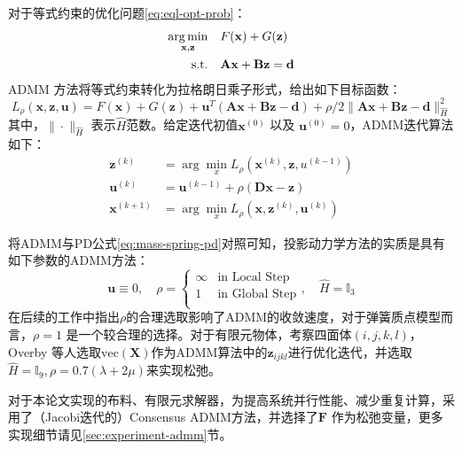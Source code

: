 对于等式约束的优化问题\ref{eq:eql-opt-prob}：
\begin{equation}\label{eq:eql-opt-prob}
\begin{aligned}
  \mathop{\arg\min}\limits_{\mathbf x,\mathbf z}&\quad F(\mathbf x)+G(\mathbf z)\\
  \mathrm{s.t.}&\quad \mathbf A\mathbf x +\mathbf B\mathbf z = \mathbf d
\end{aligned}  
\end{equation}
ADMM 方法将等式约束转化为拉格朗日乘子形式，给出如下目标函数：
\begin{equation}
  L_{\rho}(\mathbf x,\mathbf z,\mathbf u)= F(\mathbf x)+G(\mathbf z)+\mathbf u^{T}(\mathbf A\mathbf x+\mathbf B\mathbf z-\mathbf d)+\rho/2 \|\mathbf A\mathbf x+\mathbf B\mathbf z-\mathbf d\|_{\hat H}^{2}
\end{equation}
其中，$\| \cdot \|_{\hat H}$ 表示$\hat H$范数。给定迭代初值$\mathbf x^{(0)}$ 以及 $\mathbf u^{(0)} = 0$，ADMM迭代算法如下：
\begin{equation}\label{eq:admm-algorithm}
  \begin{aligned}
    \mathbf z^{(k)} &= \arg\min_{x} L_{\rho}(\mathbf x^{(k)},\mathbf  z, u^{(k-1)})\\
    \mathbf u^{(k)} &= \mathbf u^{(k-1)} + \rho(\mathbf{Dx}-\mathbf{z})\\
    \mathbf x^{(k+1)} &= \arg\min_{x} L_{\rho}(\mathbf x, \mathbf z^{(k)}, \mathbf u^{(k)})
  \end{aligned}
\end{equation}

将ADMM与PD公式\ref{eq:mass-spring-pd}对照可知，投影动力学方法的实质是具有如下参数的ADMM方法：
\begin{equation}
  \mathbf u \equiv 0,\quad \rho = \begin{cases}
    \infty & \text{in Local Step}\\
    1 & \text{in Global Step}\\
  \end{cases}, \quad\hat H = \mathbb I_3
\end{equation}
在后续的工作中指出$\rho$的合理选取影响了ADMM的收敛速度，对于弹簧质点模型而言，$\rho = 1$ 是一个较合理的选择。对于有限元物体，考察四面体$(i,j,k,l)$，Overby 等人选取$\mathrm{vec}(\mathbf X)$作为ADMM算法中的$\mathbf z_{ijkl}$进行优化迭代，并选取$\hat H=\mathbb I_{9}, \rho =  0.7(\lambda + 2\mu)$来实现松弛。

对于本论文实现的布料、有限元求解器，为提高系统并行性能、减少重复计算，采用了（Jacobi迭代的）Consensus ADMM方法，并选择了$\mathbf F$ 作为松弛变量，更多实现细节请见\ref{sec:experiment-admm}节。

